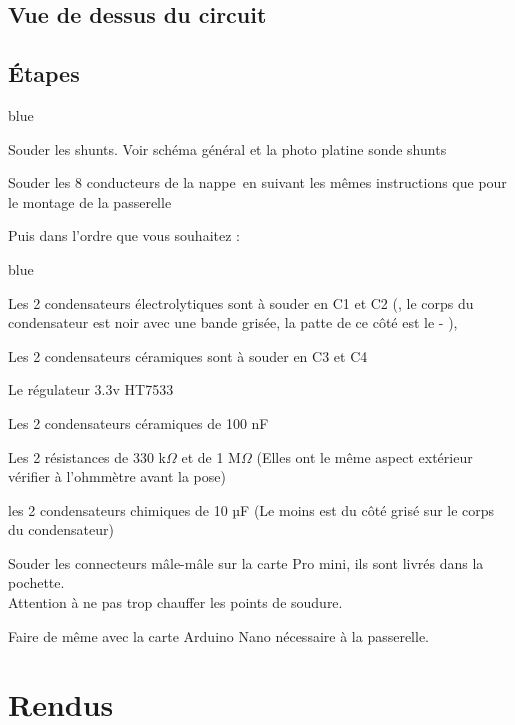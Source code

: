 \subsection{Vue de dessus du circuit}
\label{TEST}


\subsection{Étapes}
\begin{items}{blue}{\Triangle}
\item Souder les shunts. Voir schéma général et la photo platine sonde shunts
\item Souder les 8 conducteurs de la nappe en suivant les mêmes instructions que pour le montage de la passerelle
\end{items}
Puis dans l'ordre que vous souhaitez : 
\begin{items}{blue}{\Triangle}
    \item Les 2 condensateurs électrolytiques sont à souder en C1 et C2 (, le corps du condensateur est noir avec une bande grisée, la patte de ce côté est le - ),
    \item Les 2 condensateurs céramiques sont à souder en C3 et C4
    \item Le régulateur 3.3v HT7533\\

    \item Les 2 condensateurs céramiques de 100 nF
    \item Les 2 résistances de 330 k$\Omega$ et de 1 M$\Omega$    (Elles ont le même aspect extérieur vérifier à l’ohmmètre avant la pose)
    \item les 2 condensateurs chimiques de 10 µF	(Le moins est du côté grisé sur le corps du condensateur)
    \item Souder les connecteurs mâle-mâle sur la carte Pro mini, ils sont livrés dans la pochette.\\ Attention à ne pas trop chauffer les points de soudure.
    \item Faire de même avec la carte Arduino Nano nécessaire à la passerelle.
\end{items}

\section{Rendus}






